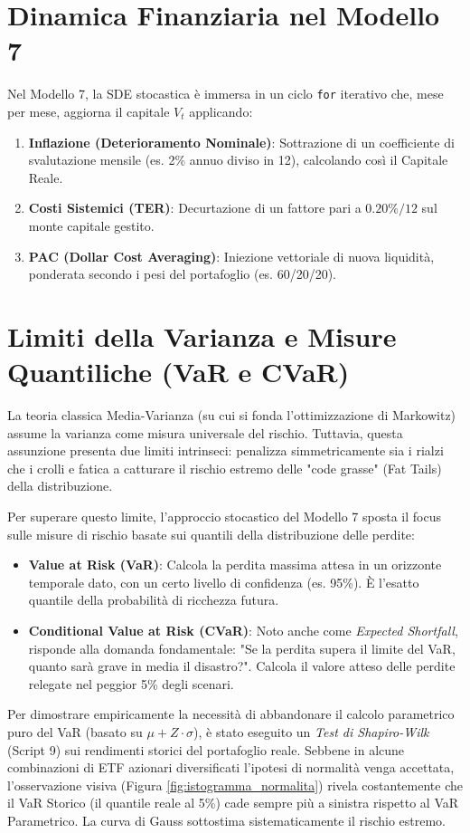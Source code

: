 \section{Dinamica Finanziaria nel Modello 7}
Nel Modello 7, la SDE stocastica \`e immersa in un ciclo \texttt{for} iterativo che, mese per mese, aggiorna il capitale $V_t$ applicando:
\begin{enumerate}
    \item \textbf{Inflazione (Deterioramento Nominale)}: Sottrazione di un coefficiente di svalutazione mensile (es. 2\% annuo diviso in 12), calcolando così il Capitale Reale.
    \item \textbf{Costi Sistemici (TER)}: Decurtazione di un fattore pari a $0.20\% / 12$ sul monte capitale gestito.
    \item \textbf{PAC (Dollar Cost Averaging)}: Iniezione vettoriale di nuova liquidit\`a, ponderata secondo i pesi del portafoglio (es. 60/20/20).
\end{enumerate}

\section{Limiti della Varianza e Misure Quantiliche (VaR e CVaR)}
La teoria classica Media-Varianza (su cui si fonda l'ottimizzazione di Markowitz) assume la varianza come misura universale del rischio. Tuttavia, questa assunzione presenta due limiti intrinseci: penalizza simmetricamente sia i rialzi che i crolli e fatica a catturare il rischio estremo delle "code grasse" (Fat Tails) della distribuzione. 

Per superare questo limite, l'approccio stocastico del Modello 7 sposta il focus sulle misure di rischio basate sui quantili della distribuzione delle perdite:
\begin{itemize}
    \item \textbf{Value at Risk (VaR)}: Calcola la perdita massima attesa in un orizzonte temporale dato, con un certo livello di confidenza (es. 95\%). È l'esatto quantile della probabilità di ricchezza futura.
    \item \textbf{Conditional Value at Risk (CVaR)}: Noto anche come \emph{Expected Shortfall}, risponde alla domanda fondamentale: "Se la perdita supera il limite del VaR, quanto sar\`a grave in media il disastro?". Calcola il valore atteso delle perdite relegate nel peggior 5\% degli scenari.
\end{itemize}

Per dimostrare empiricamente la necessità di abbandonare il calcolo parametrico puro del VaR (basato su $\mu + Z \cdot \sigma$), è stato eseguito un \emph{Test di Shapiro-Wilk} (Script 9) sui rendimenti storici del portafoglio reale. Sebbene in alcune combinazioni di ETF azionari diversificati l'ipotesi di normalità venga accettata, l'osservazione visiva (Figura \ref{fig:istogramma_normalita}) rivela costantemente che il VaR Storico (il quantile reale al 5\%) cade sempre più a sinistra rispetto al VaR Parametrico. La curva di Gauss sottostima sistematicamente il rischio estremo.

